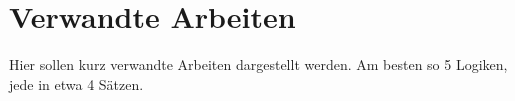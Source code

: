 \section{Verwandte Arbeiten}

Hier sollen kurz verwandte Arbeiten dargestellt werden.
Am besten so 5 Logiken, jede in etwa 4 Sätzen.